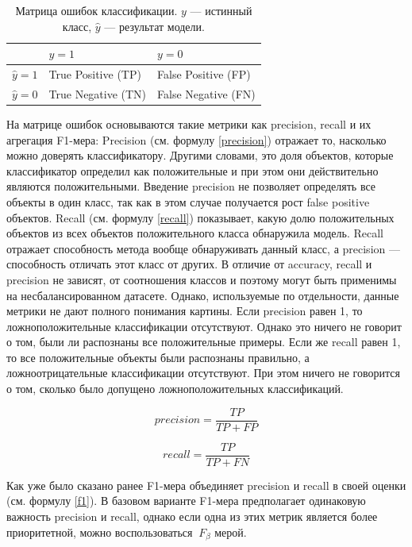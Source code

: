 \documentclass[a4paper,12pt]{extarticle}
\begin{document}
\begin{table}[h]
	\centering
	\begin{tabular}{ | l | l | l | }
		\hline
		& $y = 1$ & $y = 0$ \\ \hline
		$\hat{y} = 1$ & True Positive (TP) & False Positive (FP) \\ \hline
		$\hat{y} = 0$ & True Negative (TN) & False Negative (FN) \\ \hline
	\end{tabular}
	\caption{Матрица ошибок классификации.
		$y$ — истинный класс, $\hat{y}$ — результат модели.}
	\label{confusion_matr}
\end{table}

На матрице ошибок основываются такие метрики как precision, recall и их агрегация F1-мера: Precision (см. формулу \ref{precision}) отражает то, насколько можно доверять классификатору. Другими словами, это доля объектов, которые классификатор определил как положительные и при этом они действительно являются положительными. Введение precision не позволяет определять все объекты в один класс, так как в этом случае получается рост false positive объектов. Recall (см. формулу \ref{recall}) показывает, какую долю положительных объектов из всех объектов положительного класса обнаружила модель. Recall отражает способность метода вообще обнаруживать данный класс, а precision — способность отличать этот класс от других. В отличие от accuracy, recall и precision не зависят, от соотношения классов и поэтому могут быть применимы на несбалансированном датасете. Однако, используемые по отдельности, данные метрики не дают полного понимания картины. Если precision равен 1, то ложноположительные классификации отсутствуют. Однако это ничего не говорит о том, были ли распознаны все положительные примеры. Если же recall равен 1, то все положительные объекты были распознаны правильно, а ложноотрицательные классификации отсутствуют. При этом ничего не говорится о том, сколько было допущено ложноположительных классификаций.

\begin{equation}
	\label{precision}
	precision = \frac{TP}{TP + FP}
\end{equation}

\begin{equation}
	\label{recall}
	recall = \frac{TP}{TP + FN}
\end{equation}


Как уже было сказано ранее F1-мера объединяет precision и recall в своей оценки (см. формулу \ref{f1}). В базовом варианте F1-мера предполагает одинаковую важность precision и recall, однако если одна из этих метрик является более приоритетной, можно воспользоваться $\ F_\beta$ мерой.
\end{document}
